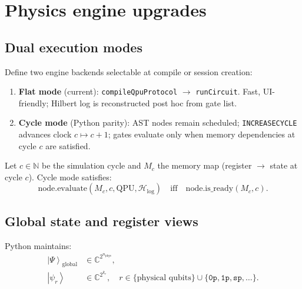 \documentclass[11pt,a4paper]{article}
\newcommand{\C}{\mathbb{C}}
\newcommand{\ket}[1]{\left|#1\right\rangle}
\newcommand{\HS}{\mathcal{H}_{\mathrm{log}}}
\begin{document}
\section{Physics engine upgrades}

\subsection{Dual execution modes}

Define two engine backends selectable at compile or session creation:

\begin{enumerate}[label=\textbf{E\arabic*.}]
  \item \textbf{Flat mode} (current): \texttt{compileQpuProtocol} $\rightarrow$ \texttt{runCircuit}. Fast, UI-friendly; Hilbert log is reconstructed post hoc from gate list.
  \item \textbf{Cycle mode} (Python parity): AST nodes remain scheduled; \texttt{INCREASECYCLE} advances clock $c\mapsto c+1$; gates evaluate only when memory dependencies at cycle $c$ are satisfied.
\end{enumerate}

Let $c\in\mathbb{N}$ be the simulation cycle and $M_c$ the memory map (register $\rightarrow$ state at cycle $c$). Cycle mode satisfies:
\begin{equation}
  \text{node.evaluate}(M_c, c, \mathrm{QPU}, \HS) \quad\text{iff}\quad \text{node.is\_ready}(M_c, c).
\end{equation}

\subsection{Global state and register views}

Python maintains:
\begin{align}
  \ket{\Psi}_{\mathrm{global}} &\in \C^{2^{n_{\mathrm{phys}}}}, \\
  \ket{\psi_r} &\in \C^{2^{k_r}}, \quad r\in\{\text{physical qubits}\}\cup\{\texttt{0p},\texttt{1p},\texttt{sp},\ldots\}.
\end{align}
\end{document}
